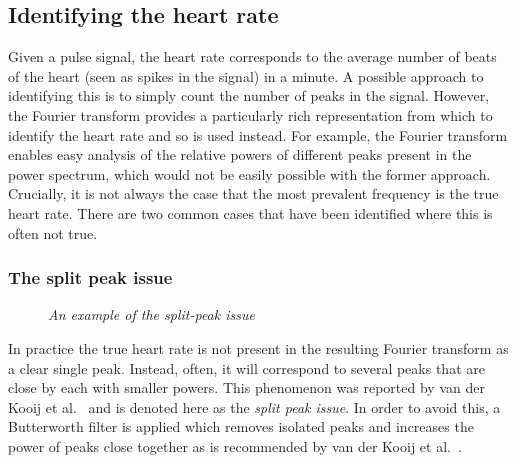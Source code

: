\subsection{Identifying the heart rate}
Given a pulse signal, the heart rate corresponds to the average number of beats of the heart (seen as spikes in the signal) in a minute. 
A possible approach to identifying this is to simply count the number of peaks in the signal. 
However, the Fourier transform provides a particularly rich representation from which to identify the heart rate and so is used instead. 
For example, the Fourier transform enables easy analysis of the relative powers of different peaks present in the power spectrum, which would not be easily possible with the former approach.
Crucially, it is not always the case that the most prevalent frequency is the true heart rate. There are two common cases that have been identified where this is often not true.

\subsubsection{The split peak issue}
\begin{figure}
    \centering
    \scalebox{0.6}{
    }
    \caption{\textit{An example of the split-peak issue}}
\end{figure}
In practice the true heart rate is not present in the resulting Fourier transform as a clear single peak. Instead, often, it will correspond to several peaks that are close by each with smaller powers. This phenomenon was reported by van der Kooij et al.~\cite{vanderKooij2019} and is denoted here as the \textit{split peak issue}.
In order to avoid this, a Butterworth filter is applied which removes isolated peaks and increases the power of peaks close together as is recommended by van der Kooij et al.~\cite{vanderKooij2019}.
